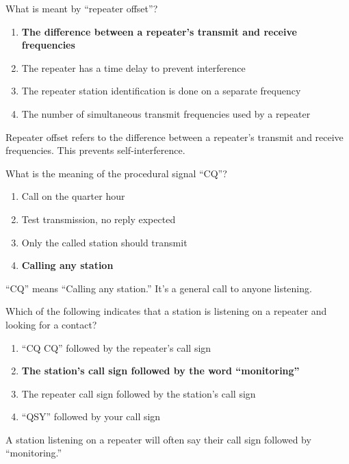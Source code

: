 \begin{tcolorbox}[colback=gray!10!white,colframe=black!75!black,title={T2A07}]
What is meant by “repeater offset”?
\begin{enumerate}[label=\Alph*),noitemsep]
    \item \textbf{The difference between a repeater’s transmit and receive frequencies}
    \item The repeater has a time delay to prevent interference
    \item The repeater station identification is done on a separate frequency
    \item The number of simultaneous transmit frequencies used by a repeater
\end{enumerate}
\end{tcolorbox}
Repeater offset refers to the difference between a repeater’s transmit and receive frequencies. This prevents self-interference.

\begin{tcolorbox}[colback=gray!10!white,colframe=black!75!black,title={T2A08}]
What is the meaning of the procedural signal “CQ”?
\begin{enumerate}[label=\Alph*),noitemsep]
    \item Call on the quarter hour
    \item Test transmission, no reply expected
    \item Only the called station should transmit
    \item \textbf{Calling any station}
\end{enumerate}
\end{tcolorbox}
“CQ” means “Calling any station.” It’s a general call to anyone listening.

\begin{tcolorbox}[colback=gray!10!white,colframe=black!75!black,title={T2A09}]
Which of the following indicates that a station is listening on a repeater and looking for a contact?
\begin{enumerate}[label=\Alph*),noitemsep]
    \item “CQ CQ” followed by the repeater’s call sign
    \item \textbf{The station’s call sign followed by the word “monitoring”}
    \item The repeater call sign followed by the station’s call sign
    \item “QSY” followed by your call sign
\end{enumerate}
\end{tcolorbox}
A station listening on a repeater will often say their call sign followed by “monitoring.”

